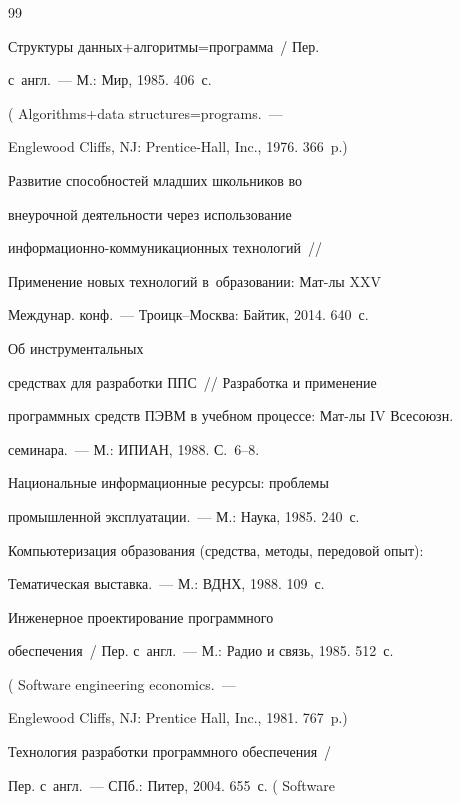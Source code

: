 {{\begin{thebibliography}{99}

 Структуры данных\;+\;алгоритмы\;=\;про\-грам\-ма~/ Пер.

с~англ.~--- М.: Мир, 1985. 406~с.

( Algorithms\;+\;data structures\;=\;programs.~---

Englewood Cliffs, NJ: Prentice-Hall, Inc., 1976. 366~p.)


 Развитие способностей младших школьников во

внеурочной деятельности через использование

ин\-фор\-ма\-ци\-он\-но-ком\-му\-ни\-ка\-ци\-он\-ных технологий~/\!\!/

Применение новых технологий в~образовании: Мат-лы XXV

Междунар. конф.~--- Троицк--Москва: Байтик, 2014. 640~с.


 Об инструментальных

средствах для разработки ППС~/\!\!/ Разработка и применение

программных средств ПЭВМ в учебном процессе: Мат-лы IV Всесоюзн.

семинара.~--- М.: ИПИАН, 1988. С.~6--8.


 Национальные информационные ресурсы: проблемы

промышленной эксплуатации.~--- М.: Наука, 1985. 240~с.


Компьютеризация образования (средства, методы, передовой опыт):

Тематическая выставка.~--- М.: ВДНХ, 1988. 109~с.


 Инженерное проектирование программного

обеспечения~/ Пер. с~англ.~--- М.: Радио и связь, 1985. 512~с.

( {Software engineering economics}.~---

      Englewood Cliffs, NJ: Prentice Hall, Inc., 1981. 767~p.)


 Технология разработки программного обеспечения~/

Пер. с~англ.~--- СПб.: Питер, 2004. 655~с. ( Software


\end{thebibliography}}}
